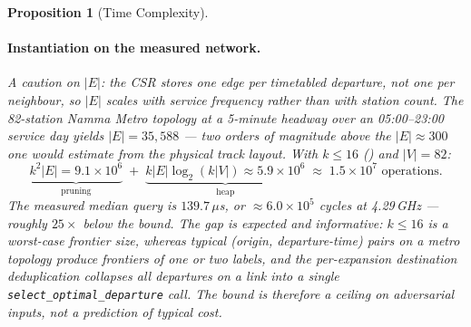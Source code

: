 \documentclass[11pt, a4paper]{article}
\newtheorem{proposition}[theorem]{Proposition}
\theoremstyle{remark}
\begin{document}
\begin{proposition}[Time Complexity]
    \paragraph{Instantiation on the measured network.}
    A caution on $|E|$: the CSR stores \emph{one edge per timetabled departure},
    not one per neighbour, so $|E|$ scales with service frequency rather than with
    station count. The 82-station Namma Metro topology at a 5-minute headway over
    an 05:00--23:00 service day yields $|E| = 35{,}588$ — two orders of magnitude
    above the $|E| \approx 300$ one would estimate from the physical track layout.
    With $k \le 16$ () and $|V| = 82$:
    \[
        \underbrace{k^2 |E| = 9.1 \times 10^6}_{\text{pruning}}
        \;+\;
        \underbrace{k |E| \log_2(k|V|) \approx 5.9 \times 10^6}_{\text{heap}}
        \;\approx\; 1.5 \times 10^7 \text{ operations.}
    \]
    The measured median query is $139.7\,\mu$s, or $\approx 6.0 \times 10^5$ cycles
    at 4.29\,GHz — roughly $25\times$ below the bound. The gap is expected and
    informative: $k \le 16$ is a worst-case frontier size, whereas typical
    (origin, departure-time) pairs on a metro topology produce frontiers of one or
    two labels, and the per-expansion destination deduplication collapses all
    departures on a link into a single \texttt{select\_optimal\_departure} call.
    The bound is therefore a ceiling on adversarial inputs, not a prediction of
    typical cost.
\end{proposition}
\end{document}
